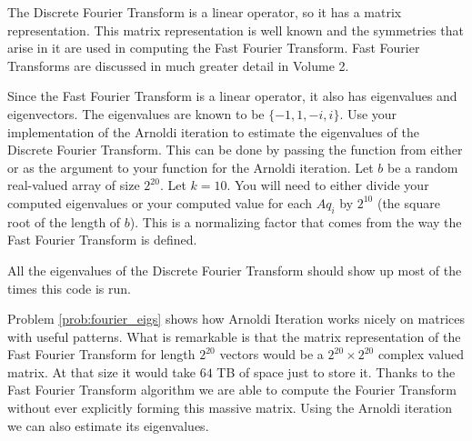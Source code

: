 \begin{problem}
\label{prob:fourier_eigs}
The Discrete Fourier Transform is a linear operator, so it has a matrix representation.
This matrix representation is well known and the symmetries that arise in it are used in computing the Fast Fourier Transform.
Fast Fourier Transforms are discussed in much greater detail in Volume 2.

Since the Fast Fourier Transform is a linear operator, it also has eigenvalues and eigenvectors.
The eigenvalues are known to be $\{ -1, 1, -i, i \}$.
Use your implementation of the Arnoldi iteration to estimate the eigenvalues of the Discrete Fourier Transform.
This can be done by passing the  function from either  or  as the argument  to your function for the Arnoldi iteration.
Let $b$ be a random real-valued array of size $2^{20}$.
Let $k = 10$.
You will need to either divide your computed eigenvalues or your computed value for each $A q_i$ by $2^{10}$ (the square root of the length of $b$).
This is a normalizing factor that comes from the way the Fast Fourier Transform is defined.

All the eigenvalues of the Discrete Fourier Transform should show up most of the times this code is run.
\end{problem}

Problem \ref{prob:fourier_eigs} shows how Arnoldi Iteration works nicely on matrices with useful patterns.
What is remarkable is that the matrix representation of the Fast Fourier Transform for length $2^{20}$ vectors would be a $2^{20} \times 2^{20}$ complex valued matrix.
At that size it would take $64$ TB of space just to store it.
Thanks to the Fast Fourier Transform algorithm we are able to compute the Fourier Transform without ever explicitly forming this massive matrix.
Using the Arnoldi iteration we can also estimate its eigenvalues.


